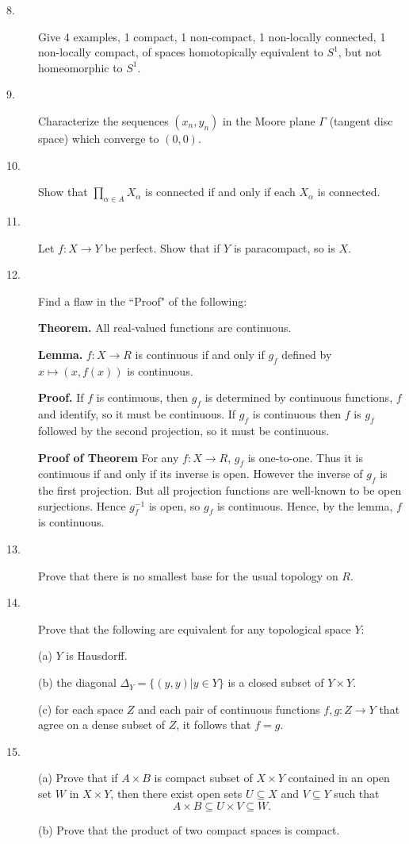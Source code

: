 \documentclass{article}
\begin{document}
\begin{description}
\item[8.]
Give 4 examples, 1 compact, 1 non-compact, 1 non-locally connected, 1
non-locally compact, of spaces homotopically equivalent to $S^1$, but not
homeomorphic to $S^1$.

\item[9.]
Characterize the sequences $(x_n, y_n)$ in the Moore plane $\Gamma$
(tangent disc space) which converge to $(0,0)$.

\item[10.]
Show that $\prod_{\alpha \in A} X_\alpha$ is connected if and only if each
$X_\alpha$ is connected.

\item[11.]
Let $f: X \to Y$ be perfect. Show that if $Y$ is paracompact, so is $X$.

\item[12.]
Find a flaw in the ``Proof" of the following:

{\bf Theorem.} All real-valued functions are continuous.

{\bf Lemma.} $f: X \to R$ is continuous if and only if $g_f$ defined by
$x \mapsto (x, f(x))$ is continuous.

{\bf Proof.}
If $f$ is continuous, then $g_f$ is determined by continuous functions, $f$
and identify, so it must be continuous. If $g_f$ is continuous then $f$
is $g_f$ followed by the second projection, so it must be continuous.

{\bf Proof of Theorem}
For any $f: X \to R$, $g_f$ is one-to-one. Thus it is continuous if and only
if its inverse is open. However the inverse of $g_f$ is the first projection.
But all projection functions are well-known to be open surjections. Hence
$g^{-1}_f$ is open, so $g_f$ is continuous. Hence, by the lemma, $f$ is
continuous.

\item[13.]
Prove that there is no smallest base for the usual topology on $R$.

\item[14.]
Prove that the following are equivalent for any topological space $Y$:

\item[\quad] (a)
$Y$ is Hausdorff.

\item[\quad] (b)
the diagonal $\Delta_Y = \{(y,y) | y \in Y\}$ is a closed subset of
$Y \times Y$.

\item[\quad] (c)
for each space $Z$ and each pair of continuous functions $f,g: Z \to Y$ that
agree on a dense subset of $Z$, it follows that $f=g$.

\item[15.] (a)
Prove that if $A \times B$ is compact subset of $X \times Y$ contained in an
open set $W$ in $X \times Y$, then there exist open sets $U \subseteq X$ and
$V \subseteq Y$ such that
$$A \times B \subseteq U \times V \subseteq W.$$

\item[\quad] (b)
Prove that the product of two compact spaces is compact.






\end{description}    
\end{document}
